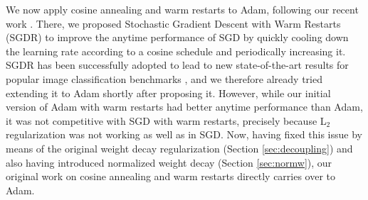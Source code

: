 \documentclass[usenames,dvipsnames]{article} %
\begin{document}
We now apply cosine annealing and warm restarts to Adam, following 
our recent work \citep{loshchilov2016sgdr}. There, we
proposed Stochastic Gradient Descent with Warm Restarts (SGDR) to improve the anytime performance of SGD by quickly cooling down the learning rate according to a cosine schedule and periodically increasing it. 
SGDR has been successfully adopted to lead to new state-of-the-art results for popular image classification benchmarks \citep{SnapshotICLR2017,gastaldi2017shake,zoph-arxiv17b}, and we therefore already tried extending it to Adam shortly after proposing it. 
However, while our initial version of Adam with warm restarts had better anytime performance than Adam, it was not competitive with SGD with warm restarts, precisely because L$_2$ regularization was not working as well as in SGD.
Now, having fixed this issue by means of the original weight decay regularization (Section \ref{sec:decoupling}) and also having introduced normalized weight decay (Section \ref{sec:normw}), 
our original work on cosine annealing and warm restarts
directly carries over to Adam.


\end{document}
